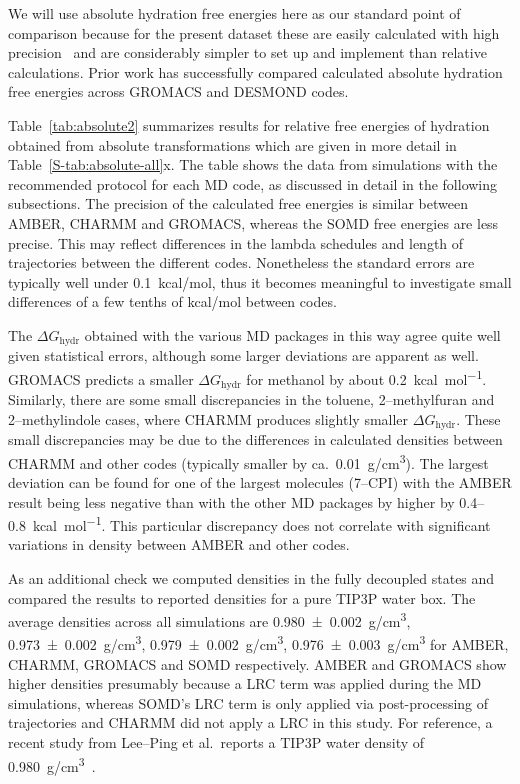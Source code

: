 \documentclass[journal=jctcce,manuscript=article]{achemso}
\begin{document}
We will use absolute hydration free energies here as our standard point of
comparison because for the present dataset these are easily calculated with high precision~\cite{doi:10.1021/acs.jced.7b00104} %
and are considerably simpler to set up and implement than relative calculations.
Prior work has successfully compared calculated absolute hydration
free energies across GROMACS and DESMOND codes.~\cite{klimovich_predicting_2010}

Table~\ref{tab:absolute2} summarizes results for relative free energies of
hydration obtained from absolute transformations which are given in more detail in Table~\ref{S-tab:absolute-all}x.  The table shows the data
from simulations with the recommended protocol for each MD code, as
discussed in detail in the following subsections.
The  precision of the calculated free energies is similar between
AMBER, CHARMM and GROMACS, whereas the SOMD free energies are less
precise.  This may reflect differences in the lambda schedules and
length of trajectories between the different codes.  Nonetheless the
standard errors are typically well under \SI{0.1}{kcal/mol}, thus it
becomes meaningful to investigate small differences of a few tenths of
\si{kcal/mol} between codes.

The $\Delta G_{\mathrm{hydr}}$
obtained with the various MD packages in
this way agree quite well given statistical errors, although some larger deviations are apparent as
well.  GROMACS predicts a smaller $\Delta G_{\mathrm{hydr}}$ for
methanol by about \SI{+0.2}{kcal.mol^{-1}}.  Similarly, there are some
small discrepancies in the toluene, 2--methylfuran and 2--methylindole
cases, where CHARMM produces slightly smaller $\Delta
G_{\mathrm{hydr}}$.  These small discrepancies may be due to the
differences in calculated densities between CHARMM and other codes
(typically smaller by ca.\ \SI{0.01}{g/cm^3}).
The largest deviation can be found for one of the largest
molecules (7--CPI) with the AMBER result being less negative than with
the other MD packages by higher by 0.4--\SI{0.8}{kcal.mol^{-1}}.  This
particular discrepancy does not correlate with significant variations
in density between AMBER and other codes.

As an additional check we computed densities in the fully decoupled
states and compared the results to reported densities for a pure TIP3P
water box.  The average densities across all simulations are
\SI{0.980+-0.002}{g/cm^3}, \SI{0.973+-0.002}{g/cm^3},
\SI{0.979+-0.002}{g/cm^3}, \SI{0.976+-0.003}{g/cm^3} for AMBER,
CHARMM, GROMACS and SOMD respectively.  AMBER and GROMACS show higher
densities presumably because a LRC term was applied during the MD
simulations, whereas SOMD's LRC term is only applied via
post-processing of trajectories and CHARMM did not apply a LRC in this
study.  For reference, a recent study from Lee--Ping et al.\ reports a
TIP3P water density of \SI{0.980}{g/cm^3}~\cite{doi:10.1021/jz500737m}.
\end{document}
